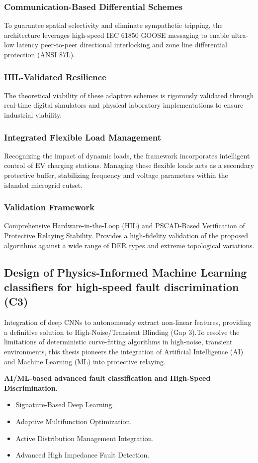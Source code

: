 \subsubsection{Communication-Based Differential Schemes}
To guarantee spatial selectivity and eliminate sympathetic tripping, the architecture leverages high-speed IEC 61850 GOOSE messaging to enable ultra-low latency peer-to-peer directional interlocking and zone line differential protection (ANSI 87L).
\subsubsection{HIL-Validated Resilience}
The theoretical viability of these adaptive schemes is rigorously validated through real-time digital simulators and physical laboratory implementations to ensure industrial viability.
\subsubsection{Integrated Flexible Load Management}
Recognizing the impact of dynamic loads, the framework incorporates intelligent control of EV charging stations. Managing these flexible loads acts as a secondary protective buffer, stabilizing frequency and voltage parameters within the islanded microgrid cutset.

\subsubsection{Validation Framework}
Comprehensive Hardware-in-the-Loop (HIL) and PSCAD-Based Verification of Protective Relaying Stability. Provides a high-fidelity validation of the proposed algorithms against a wide range of DER types and extreme topological variations.

\subsection{Design of Physics-Informed Machine Learning classifiers for high-speed fault discrimination (C3)}

Integration of deep CNNs to autonomously extract non-linear features, providing a definitive solution to High-Noise/Transient Blinding (Gap 3).To resolve the limitations of deterministic curve-fitting algorithms in high-noise, transient environments, this thesis pioneers the integration of Artificial Intelligence (AI) and Machine Learning (ML) into protective relaying.

\textbf{AI/ML-based advanced fault classification and High-Speed Discrimination}.
\begin{itemize}
        \item Signature-Based Deep Learning. 
        \item Adaptive Multifunction Optimization.
        \item Active Distribution Management Integration.
        \item Advanced High Impedance Fault Detection.
\end{itemize}


